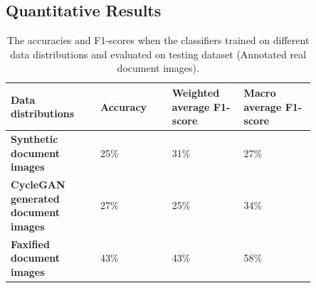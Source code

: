 
\subsection{Quantitative Results}\label{QuantitativeResults}


\hspace*{5.0em}

\begin{table}[H]
\begin{tabular}{P{0.25\linewidth} P{0.20\linewidth} P{0.20\linewidth} P{0.20\linewidth}} 
	\toprule
	\bf{Data distributions} & \bf{Accuracy}  & \bf{Weighted average F1-score} & \bf{Macro average F1-score} \\[0.0ex] 
	\midrule
     \bf{Synthetic document images} & 25\% & 31\% & 27\%\\[0.0ex]
     \midrule
     \bf{\ac{CycleGAN} generated document images} & 27\% & 25\% & 34\%\\[0.0ex]
     \midrule
     \bf{Faxified document images} & 43\% & 43\% & 58\%\\[0.0ex]
     \bottomrule
\end{tabular}
 \caption[The accuracies and F1-scores when the classifiers trained on different data distributions and evaluated on testing dataset (Annotated real document images).]{The accuracies and F1-scores when the classifiers trained on different data distributions and evaluated on testing dataset (Annotated real document images).}
    \label{table:finalResults}
\end{table}


